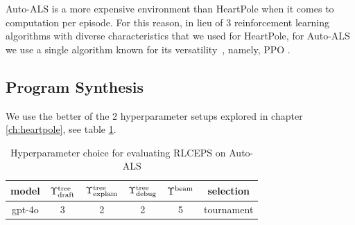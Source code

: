 Auto-ALS is a more expensive environment than HeartPole when it comes to computation per episode.
For this reason, in lieu of 3 reinforcement learning algorithms with diverse characteristics that we used for HeartPole, for Auto-ALS we use a single algorithm known for its versatility~\cite{alaghaTargetLocalizationUsing2022, bilbanOptimizingAutonomousVehicle2025, bohnDeepReinforcementLearning2019, coreccoProximalPolicyOptimizationbased2023, funikaAutomatedCloudResources2023, hasankhaniIntegratedPathPlanning2023, huangImprovingTrafficSignal2023, kalusivalingamOptimizingIndustrialSystems2020, kleinOptimizingParametersSwarm2024, liIntelligentDecisionJoint2025, liuApplicationAdvancedTree2022, lopesIntelligentControlQuadrotor2018, luAdaptiveEnergyManagement2024, maMultiuserMobileEdge2024, maTaskOffloadingScheme2025, mayerModularProductionControl2021, meloLearningHumanoidRobot2019, mengProximalPolicyOptimization2023, ouyangTokenlevelProximalPolicy2024, pinciroliDeepReinforcementLearning2021, proctorProximalPolicyOptimization2021, quangtranProximalPolicyOptimization2020, rehmanReinforcementLearningdrivenProximal2024, silvaControlConventionalContinuous2024, silvaTemporalGraphTraversals2020, vanvuchelenUseProximalPolicy2020, weiMixedautonomyTrafficControl2019, wuCombustionOptimizationStudy2024, wuProximalPolicyOptimization2023, yeAutomatedLaneChange2020, yinHyperheuristicAlgorithmProximal2024, zhangProximalPolicyOptimization2024, zhangRealtimeAutonomousLine2020, zhaoPPOTAAdaptiveTask2023}, namely, PPO \cite{schulmanProximalPolicyOptimization2017}. 

\subsection{Program Synthesis}

We use the better of the 2 hyperparameter setups explored in chapter \ref{ch:heartpole}, see table \ref{tab:rlceps-auto-als}.

\begin{table}
    \centering
    \begin{tabular}{|c|c|c|c|c|c|}
        model & $\Upsilon^\text{tree}_\text{draft}$ & $\Upsilon^\text{tree}_\text{explain}$ & $\Upsilon^\text{tree}_\text{debug}$ & $\Upsilon^\text{beam}$ & selection \\
        \midrule
        gpt-4o & 3 & 2 & 2 & 5 & tournament
    \end{tabular}
    \caption{Hyperparameter choice for evaluating RLCEPS on Auto-ALS}
    \label{tab:rlceps-auto-als}
\end{table}

